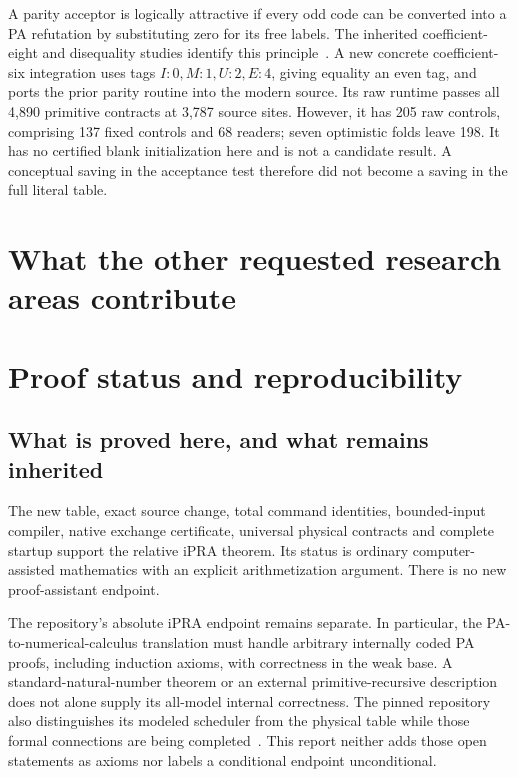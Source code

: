 \documentclass[11pt,letterpaper]{article}
\begin{document}
A parity acceptor is logically attractive if every odd code can be
converted into a PA refutation by substituting zero for its free labels.
The inherited coefficient-eight and disequality studies identify this
principle~\cite{parity}. A new concrete coefficient-six integration uses
tags $I:0,M:1,U:2,E:4$, giving equality an even tag, and ports the prior
parity routine into the modern source. Its raw runtime passes all 4,890
primitive contracts at 3,787 source sites. However, it has 205 raw
controls, comprising 137 fixed controls and 68 readers; seven optimistic
folds leave 198. It has no certified blank initialization here and is not
a candidate result. A conceptual saving in the acceptance test therefore
did not become a saving in the full literal table.

\section{What the other requested research areas contribute}
\label{sec:other}



\section{Proof status and reproducibility}
\label{sec:status}

\subsection{What is proved here, and what remains inherited}

The new table, exact source change, total command identities, bounded-input
compiler, native exchange certificate, universal physical contracts and
complete startup support the relative iPRA theorem. Its status is ordinary
computer-assisted mathematics with an explicit arithmetization argument.
There is no new proof-assistant endpoint.

The repository's absolute iPRA endpoint remains separate. In particular,
the PA-to-numerical-calculus translation must handle arbitrary internally
coded PA proofs, including induction axioms, with correctness in the weak
base. A standard-natural-number theorem or an external primitive-recursive
description does not alone supply its all-model internal correctness.
The pinned repository also distinguishes its modeled scheduler from the
physical table while those formal connections are being completed~\cite{pa-status}.
This report neither adds those open statements as axioms nor labels a
conditional endpoint unconditional.
\end{document}

